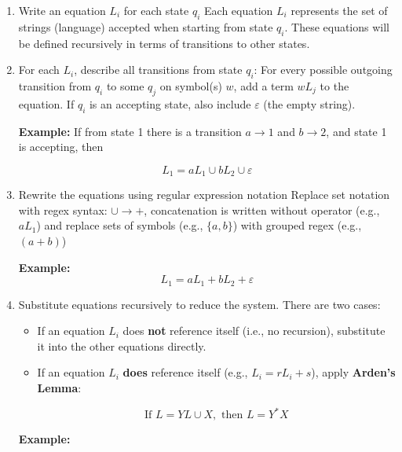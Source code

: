 \begin{enumerate}

    \item Write an equation \(L_i\) for each state \(q_i\) 
    Each equation \(L_i\) represents the set of strings (language) accepted when starting from state 
    \(q_i\). These equations will be defined recursively in terms of transitions to other states.

    \item For each \(L_i\), describe all transitions from state \(q_i\):  
    For every possible outgoing transition from \(q_i\) to some \(q_j\) on symbol(s) \(w\), add a term 
    \(w L_j\) to the equation. If \(q_i\) is an accepting state, also include \(\varepsilon\) (the empty 
    string).

    \textbf{Example:} If from state 1 there is a transition \(a \to 1\) and \(b \to 2\), and state 1 is 
    accepting, then  
    
    \[
        L_1 = a L_1 \cup b L_2 \cup \varepsilon
    \]

    \item Rewrite the equations using regular expression notation  
    Replace set notation with regex syntax: \(\cup \to +\),  concatenation is written without operator 
    (e.g., \(a L_1\)) and replace sets of symbols (e.g., \(\{a, b\}\)) with grouped regex (e.g., \((a + b)\))

    \textbf{Example:}  
    \[
        L_1 = a L_1 + b L_2 + \varepsilon
    \]

    \item Substitute equations recursively to reduce the system. There are two cases:  
    
    \begin{itemize}
        
        \item If an equation \(L_i\) does \textbf{not} reference itself (i.e., no recursion), substitute 
        it into the other equations directly.
        
        \item If an equation \(L_i\) \textbf{does} reference itself (e.g., \(L_i = r L_i + s\)), apply 
        \textbf{Arden's Lemma}:  
        
        \[
            \text{If } L = YL \cup X, \text{ then } L = Y^*X
        \]
    
    \end{itemize}

    \textbf{Example:}  \begin{enumerate}
    

\end{enumerate}
\end{enumerate}
